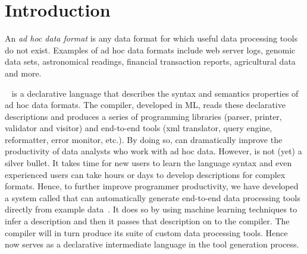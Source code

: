 \section{Introduction}\label{sec:intro}



An {\em ad hoc data format} is any data format for which useful data processing
tools do not exist.  Examples of ad hoc data formats include web server logs,
genomic data sets, astronomical readings, financial transaction reports, 
agricultural data and more.  

\pads~\cite{fisher+:pads,padsweb} is a declarative 
language that describes the syntax and semantics properties of ad hoc data
formats.  The \pads{} compiler, developed in ML,
reads these declarative descriptions
and produces a series of programming libraries (parser, printer, validator
and visitor) and end-to-end tools (xml translator, query engine, reformatter,
error monitor, etc.).  By doing so, \pads{} can dramatically improve the 
productivity of data analysts who work with ad hoc data.
However, \pads{} is not (yet) a silver bullet.  It takes time for new users
to learn the language syntax and even experienced users can take hours or 
days to develop descriptions for complex formats.  Hence, to further improve
programmer productivity, we have developed a system 
called \learnpads{} that can automatically generate end-to-end data
processing tools directly from example 
data~\cite{fisher+:dirttoshovels,fisher+:sigmod08}.  
It does so by using machine learning techniques to infer 
a \pads{} description and then it passes that description on to the
\pads{} compiler.  The compiler will in turn produce its suite of 
custom data processing tools.  Hence \pads{} now serves as a declarative
intermediate language in the tool generation process.

